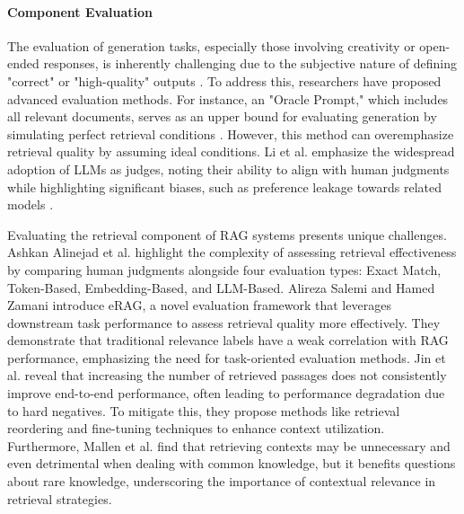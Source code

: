 \paragraph{Component Evaluation}
The evaluation of generation tasks, especially those involving creativity or open-ended responses, is inherently challenging due to the subjective nature of defining "correct" or "high-quality" outputs \cite{Yu.2024}. To address this, researchers have proposed advanced evaluation methods. For instance, an "Oracle Prompt," which includes all relevant documents, serves as an upper bound for evaluating generation by simulating perfect retrieval conditions \cite{Krishna.19.09.2024}. However, this method can overemphasize retrieval quality by assuming ideal conditions. Li et al. emphasize the widespread adoption of LLMs as judges, noting their ability to align with human judgments while highlighting significant biases, such as preference leakage towards related models \cite{Li.13.01.2025}.

Evaluating the retrieval component of RAG systems presents unique challenges. Ashkan Alinejad et al.\cite{Alinejad.2024} highlight the complexity of assessing retrieval effectiveness by comparing human judgments alongside four evaluation types: Exact Match, Token-Based, Embedding-Based, and LLM-Based. Alireza Salemi and Hamed Zamani\cite{Salemi.2024} introduce eRAG, a novel evaluation framework that leverages downstream task performance to assess retrieval quality more effectively. They demonstrate that traditional relevance labels have a weak correlation with RAG performance, emphasizing the need for task-oriented evaluation methods. Jin et al.\cite{Jin.19.09.2024} reveal that increasing the number of retrieved passages does not consistently improve end-to-end performance, often leading to performance degradation due to hard negatives. To mitigate this, they propose methods like retrieval reordering and fine-tuning techniques to enhance context utilization. Furthermore, Mallen et al. \cite{Mallen.2023} find that retrieving contexts may be unnecessary and even detrimental when dealing with common knowledge, but it benefits questions about rare knowledge, underscoring the importance of contextual relevance in retrieval strategies.

